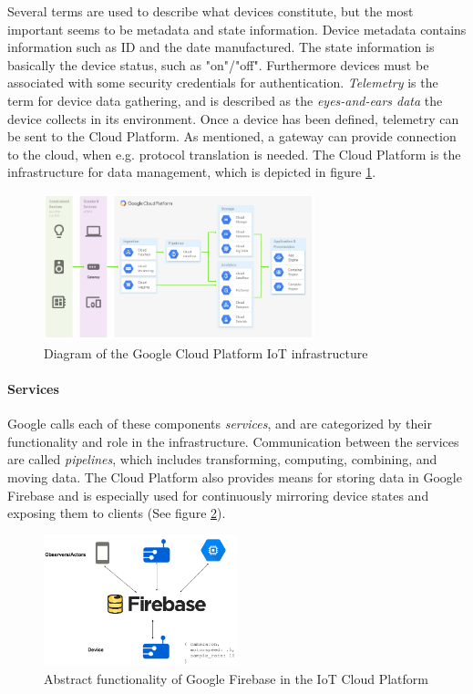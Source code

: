 Several terms are used to describe what devices constitute, but the most important seems to be metadata and state information. Device metadata contains information such as ID and the date manufactured. The state information is basically the device status, such as "on"/"off". Furthermore devices must be associated with some security credentials for authentication. \textit{Telemetry} is the term for device data gathering, and is described as the \textit{eyes-and-ears data} the device collects in its environment. Once a device has been defined, telemetry can be sent to the Cloud Platform. As mentioned, a gateway can provide connection to the cloud, when e.g. protocol translation is needed. The Cloud Platform is the infrastructure for data management, which is depicted in figure \ref{fig:gcp:infrastructure}.

\begin{figure}[h!]
	\centering
	\includegraphics[width=0.7\textwidth]{figures/gcp/infrastructure.png}
	\caption{Diagram of the Google Cloud Platform IoT infrastructure}
	\label{fig:gcp:infrastructure}
\end{figure}

\paragraph{Services}
Google calls each of these components \textit{services}, and are categorized by their functionality and role in the infrastructure. Communication between the services are called \textit{pipelines}, which includes transforming, computing, combining, and moving data. The Cloud Platform also provides means for storing data in Google Firebase\cite{website:firebase}
and is especially used for continuously mirroring device states and exposing them to clients (See figure \ref{fig:gcp:firebase}).

\begin{figure}[h!]
	\centering
	\includegraphics[width=0.5\textwidth]{figures/gcp/firebase.png}
	\caption{Abstract functionality of Google Firebase in the IoT Cloud Platform}
	\label{fig:gcp:firebase}
\end{figure}

